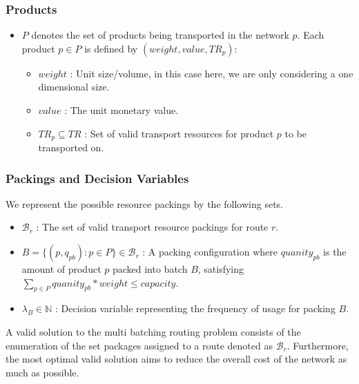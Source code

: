 \documentclass{article}
\begin{document}
\subsubsection{Products}
\begin{itemize}
    \item $P$ denotes the set of products being transported in the network $p$. Each product $p \in P$ is defined by $(weight, value, TR_p)$:
    \begin{itemize}
        \item $weight$ : Unit size/volume, in this case here, we are only considering a one dimensional size.
        \item $value$ : The unit monetary value.
        \item $TR_p \subseteq TR$ : Set of valid transport resources for product $p$ to be transported on.
    \end{itemize}
\end{itemize}

\subsubsection{Packings and Decision Variables}
We represent the possible resource packings by the following sets.
\begin{itemize}
    \item $\mathcal{B}_r$ : The set of valid transport resource packings for route $r$.
    \item $B = \{ (p, q_{pb}) : p \in P \} \in \mathcal{B}_r$ : A packing configuration where $quanity_{pb}$ is the amount of product $p$ packed into batch $B$, satisfying $\sum_{p \in P} quanity_{pb} *  weight \leq capacity$.
    \item $\lambda_B \in \mathbb{N}$ : Decision variable representing the frequency of usage for packing $B$.
\end{itemize}

A valid solution to the multi batching routing problem consists of the enumeration of the set packages assigned to a route denoted as $\mathcal{B}_r$. Furthermore, the most optimal valid solution aims to reduce the overall cost of the network as much as possible.
\end{document}
